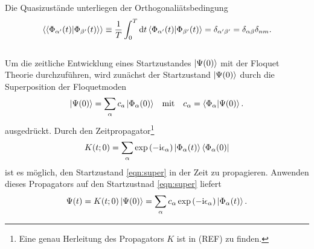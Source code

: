 Die Quasizustände unterliegen der Orthogonaliätsbedingung
\begin{align}
  \braket{\braket{\Phi_{\alpha' }(t)|\Phi_{\beta'}(t)}}\equiv \frac{1}{T} \int_0^T\mathrm{d}t
  \braket{\Phi_{\alpha' }(t)|\Phi_{\beta'}(t)}=\delta_{\alpha'\beta'}=\delta_{\alpha\beta}\delta_{nm}. \label{eqn:orhto}
\end{align}
\\
Um die zeitliche Entwicklung
eines Startzustandes $\ket{\Psi(0)}$
mit der Floquet Theorie durchzuführen,
wird
zunächst der Startzustand $\ket{\Psi(0)}$ durch
die Superposition der Floquetmoden
\begin{align}
  \ket{\Psi(0)}=\sum_\alpha c_a\ket{\Phi_\alpha(0)}& &\text{mit}&  &c_\alpha=\braket{\Phi_\alpha|\Psi(0)}.  \label{eqn:super}
\end{align}
ausgedrückt.
Durch den Zeitpropagator\footnote{Eine genau Herleitung des Propagators $K$ ist in (REF) zu finden.}
\begin{align}
  K(t;0)=\sum_\alpha \exp\left(-\mathrm{i}\epsilon_\alpha \right)\ket{\Phi_\alpha(t)}\bra{\Phi_\alpha(0)} \label{eqn:zeitoperator}
\end{align}
ist es möglich, den Startzustand \eqref{eqn:super}
in der Zeit zu propagieren.
Anwenden dieses Propagators auf den Startzustnad
\eqref{eqn:super}
liefert
\begin{align}
  \Psi(t)=K(t;0) \ket{\Psi(0)}=\sum_\alpha c_\alpha \exp\left(-\mathrm{i}\epsilon_\alpha \right)\ket{\Phi_\alpha(t)}. \label{eqn:psi_t}
\end{align}
%

